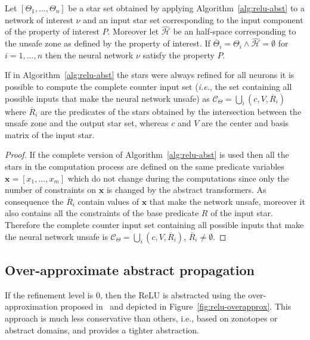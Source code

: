 \begin{proposition}
\label{prop:safety}
Let $[\Theta_1, ..., \Theta_n]$ be a star set obtained by applying 
Algorithm~\ref{alg:relu-abst} to a network of interest $\nu$ and an input star set 
corresponding to the input component of the property of interest $P$. Moreover let 
$\mathcal{\hat{H}}$ be an half-space corresponding to the unsafe zone as defined 
by the property of interest. 
If $\overline{\Theta}_i = \Theta_i \wedge \mathcal{\hat{H}} = \emptyset$ for $i = 1, ..., n$ 
then the neural network $\nu$ satisfy the property $P$.
\end{proposition}

\begin{proposition}
\label{prop:counter-input-set}
If in Algorithm~\ref{alg:relu-abst} the stars were always refined for all 
neurons it is possible to compute the complete counter input set 
(\textit{i.e.}, the set containing all possible inputs that make the neural 
network unsafe) as $\mathcal{C}_{\Theta} = \bigcup_i (c, V, \overline{R}_i)$ 
where $\overline{R}_i$ are the predicates of the stars obtained by the 
intersection between the unsafe zone and the output star set, whereas $c$ 
and $V$ are the center and basis matrix of the input star. 
\end{proposition}

\begin{proof}
\label{proof:counter-input-set}
If the complete version of Algorithm~\ref{alg:relu-abst} is used then all 
the stars in the computation process are defined on the same predicate variables
$\textbf{x} = [x_1, ..., x_m]$ which do not change during the computations since 
only the number of constraints on $\textbf{x}$ is changed by the abstract
transformers. As consequence the $\overline{R}_i$ contain values of $\textbf{x}$ 
that make the network unsafe, moreover it also contains all the constraints of
the base predicate $R$ of the input star. Therefore the complete counter input 
set containing all possible inputs that make the neural network unsafe is
$\mathcal{C}_{\Theta} = \bigcup_i (c, V, \overline{R}_i)$, $\overline{R}_i \neq \emptyset$.
\end{proof}

\subsection{Over-approximate abstract propagation}
\label{subsec:relu-overapprox}

If the refinement level is $0$, then the ReLU is abstracted using 
the over-approximation proposed in~\cite{tran2019star} and 
depicted in Figure~\ref{fig:relu-overapprox}. This approach is 
much less conservative than others, i.e., based on zonotopes or 
abstract domains, and provides a tighter abstraction.

